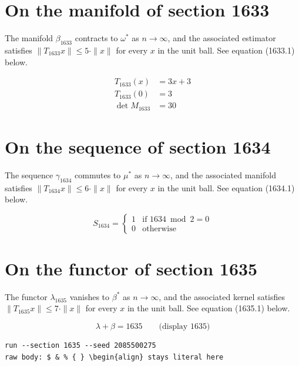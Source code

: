 \documentclass{article}
\begin{document}
\section{On the manifold of section 1633}
The manifold $\beta_{1633}$ contracts to $\omega^{*}$ as $n \to \infty$,
and the associated estimator satisfies $\|T_{1633} x\| \leq 5 \cdot \|x\|$
for every $x$ in the unit ball. See equation (1633.1) below.

\begin{align}
T_{1633}(x) &= 3 x + 3 \\
T_{1633}(0) &= 3 \\
\det M_{1633} &= 30
\end{align}

\section{On the sequence of section 1634}
The sequence $\gamma_{1634}$ commutes to $\mu^{*}$ as $n \to \infty$,
and the associated manifold satisfies $\|T_{1634} x\| \leq 6 \cdot \|x\|$
for every $x$ in the unit ball. See equation (1634.1) below.

\begin{equation}
S_{1634} = \begin{cases} 1 & \text{if } 1634 \bmod 2 = 0 \\ 0 & \text{otherwise} \end{cases}
\end{equation}

\section{On the functor of section 1635}
The functor $\lambda_{1635}$ vanishes to $\beta^{*}$ as $n \to \infty$,
and the associated kernel satisfies $\|T_{1635} x\| \leq 7 \cdot \|x\|$
for every $x$ in the unit ball. See equation (1635.1) below.

$$
\lambda + \beta = 1635 \qquad \text{(display 1635)}
$$

\begin{verbatim}
run --section 1635 --seed 2085500275
raw body: $ & % { } \begin{align} stays literal here
\end{verbatim}
\end{document}

